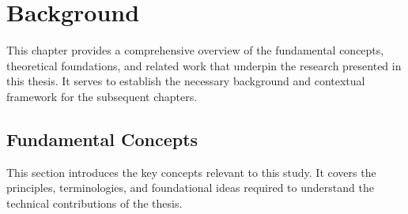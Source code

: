 \chapter{Background}
\label{chapter2}

\begin{paragraph}
This chapter provides a comprehensive overview of the fundamental concepts, theoretical foundations, and related work that underpin the research presented in this thesis. It serves to establish the necessary background and contextual framework for the subsequent chapters.
\end{paragraph}
\vspace{12pt}

\section{Fundamental Concepts}

\begin{paragraph}
This section introduces the key concepts relevant to this study. It covers the principles, terminologies, and foundational ideas required to understand the technical contributions of the thesis.
\end{paragraph}
